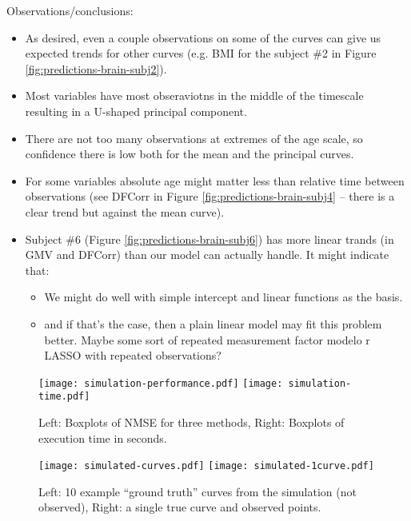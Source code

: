 \documentclass{article}
\begin{document}
Observations/conclusions:
\begin{itemize}
  \item As desired, even a couple observations on some of the curves can give us expected trends for other curves (e.g. BMI for the subject \#2 in Figure \ref{fig:predictions-brain-subj2}).
  \item Most variables have most obseraviotns in the middle of the timescale resulting in a U-shaped principal component.
  \item There are not too many observations at extremes of the age scale, so confidence there is low both for the mean and the principal curves.
  \item For some variables absolute age might matter less than relative time between observations (see DFCorr in Figure \ref{fig:predictions-brain-subj4} -- there is a clear trend but against the mean curve).
\item Subject \#6 (Figure \ref{fig:predictions-brain-subj6}) has more linear trands (in GMV and DFCorr) than our model can actually handle. It might indicate that:
  
  \begin{itemize}
    \item We might do well with simple intercept and linear functions as the basis.
    \item and if that's the case, then a plain linear model may fit this problem better. Maybe some sort of repeated measurement factor modelo r LASSO with repeated observations?
  \end{itemize}
\end{itemize}

\begin{figure}
  \begin{center}
    \texttt{[image: simulation-performance.pdf]}
    \texttt{[image: simulation-time.pdf]}
  \end{center}
  \caption{Left: Boxplots of NMSE for three methods, Right: Boxplots of execution time in seconds.  \label{fig:boxplots}}
\end{figure}

\begin{figure}
  \begin{center}
    \texttt{[image: simulated-curves.pdf]}
    \texttt{[image: simulated-1curve.pdf]}
  \end{center}
  \caption{Left: 10 example ``ground truth'' curves from the simulation (not observed), Right: a single true curve and observed points.\label{fig:curves}}
\end{figure}
\end{document}
